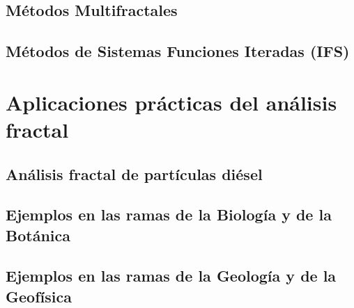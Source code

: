 \subsection{Métodos Multifractales}
\subsection{Métodos de Sistemas Funciones Iteradas (IFS)}
\section{Aplicaciones prácticas del análisis fractal}
\subsection{Análisis fractal de partículas diésel}
\subsection{Ejemplos en las ramas de la Biología y de la Botánica}
\subsection{Ejemplos en las ramas de la Geología y de la Geofísica}


\newpage
	
